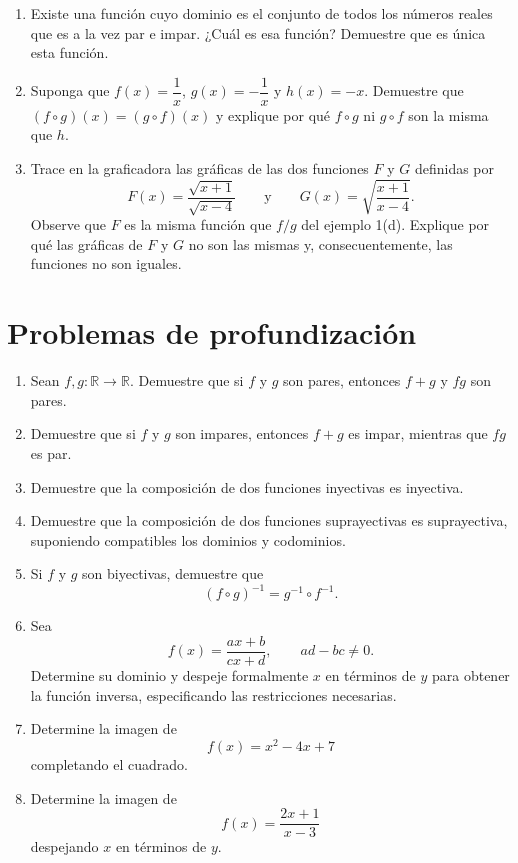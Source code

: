 \documentclass[12pt]{article}
\theoremstyle{remark}
\newcommand{\R}{\mathbb{R}}
\begin{document}
\begin{enumerate}[start=46]
\item Existe una función cuyo dominio es el conjunto de todos los números reales que es a la vez par e impar. ¿Cuál es esa función? Demuestre que es única esta función.
\item Suponga que $f(x)=\dfrac1x$, $g(x)=-\dfrac1x$ y $h(x)=-x$. Demuestre que $(f\circ g)(x)=(g\circ f)(x)$ y explique por qué $f\circ g$ ni $g\circ f$ son la misma que $h$.
\item Trace en la graficadora las gráficas de las dos funciones $F$ y $G$ definidas por
\[
F(x)=\frac{\sqrt{x+1}}{\sqrt{x-4}}
\qquad\text{y}\qquad
G(x)=\sqrt{\frac{x+1}{x-4}}.
\]
Observe que $F$ es la misma función que $f/g$ del ejemplo 1(d). Explique por qué las gráficas de $F$ y $G$ no son las mismas y, consecuentemente, las funciones no son iguales.
\end{enumerate}

\section{Problemas de profundización}

\begin{enumerate}
    \item Sean $f,g:\R\to\R$. Demuestre que si $f$ y $g$ son pares, entonces
    $f+g$ y $fg$ son pares.

    \item Demuestre que si $f$ y $g$ son impares, entonces $f+g$ es impar,
    mientras que $fg$ es par.

    \item Demuestre que la composición de dos funciones inyectivas es
    inyectiva.

    \item Demuestre que la composición de dos funciones suprayectivas es
    suprayectiva, suponiendo compatibles los dominios y codominios.

    \item Si $f$ y $g$ son biyectivas, demuestre que
    \[
    (f\circ g)^{-1}=g^{-1}\circ f^{-1}.
    \]

    \item Sea
    \[
    f(x)=\frac{ax+b}{cx+d},
    \qquad ad-bc\neq0.
    \]
    Determine su dominio y despeje formalmente $x$ en términos de $y$ para
    obtener la función inversa, especificando las restricciones necesarias.

    \item Determine la imagen de
    \[
    f(x)=x^2-4x+7
    \]
    completando el cuadrado.

    \item Determine la imagen de
    \[
    f(x)=\frac{2x+1}{x-3}
    \]
    despejando $x$ en términos de $y$.
\end{enumerate}
\end{document}
